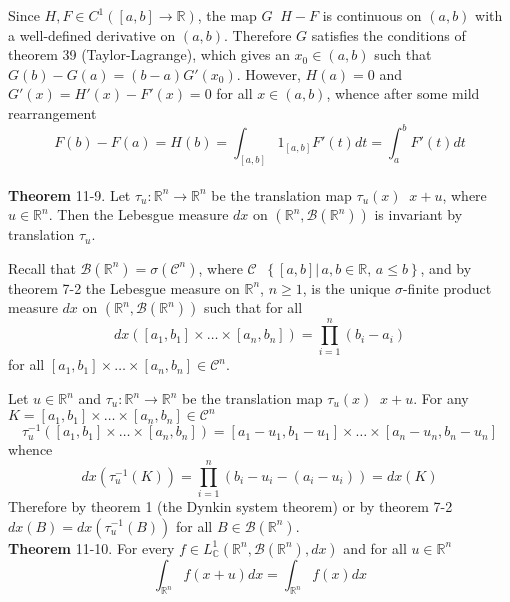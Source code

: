 \documentclass[a4paper]{article}
\newcommand{\obj}[1]{\left\{ #1 \right \}}
\newcommand{\clo}[1]{\left [ #1 \right ]}
\newcommand{\brac}[1]{\left ( #1 \right )}
\newcommand{\induc}[1]{\left . #1 \right \vert}
\newcommand{\Real}{\mathbb{R}}
\newcommand{\Cplx}{\mathbb{C}}
\newcommand{\Ccal}{\mathcal{C}}
\newcommand{\borel}[1]{\mathcal{B}\brac{#1}}
\newcommand{\defn}{\mathop{\overset{\Delta}{=}}\nolimits}
\begin{document}
Since $H,F\in C^1\brac{\clo{a,b}\to\Real}$, the map $G\defn H-F$ is continuous on $\brac{a,b}$ with a well-defined derivative on $\brac{a,b}$. Therefore $G$ satisfies the conditions of theorem 39 (Taylor-Lagrange), which gives an $x_0\in \brac{a,b}$ such that $G\brac{b}-G\brac{a} = \brac{b-a} G'\brac{x_0}$. However, $H\brac{a}=0$ and $G'\brac{x} = H'\brac{x} - F'\brac{x} = 0$ for all $x\in \brac{a,b}$, whence after some mild rearrangement \[F\brac{b}-F\brac{a} = H\brac{b} = \int_{\clo{a,b}} 1_{\clo{a,b}} F'\brac{t} dt = \int_a^b F'\brac{t} dt\]\\

\label{thm:dx_n_translation_invariance} \noindent \textbf{Theorem} 11-9.
Let $\tau_u:\Real^n\to \Real^n$ be the translation map $\tau_u\brac{x}\defn x+u$, where $u\in \Real^n$. Then the Lebesgue measure $dx$ on $\brac{\Real^n, \borel{\Real^n}}$ is invariant by translation $\tau_u$.

Recall that $\borel{\Real^n} = \sigma\brac{ \Ccal^n }$, where $\Ccal\defn\obj{ \induc{\clo{a,b}}\, a,b\in \Real,\, a\leq b }$, and by theorem 7-2 the Lebesgue measure on $\Real^n$, $n\geq 1$, is the unique $\sigma$-finite product measure $dx$ on $\brac{\Real^n, \borel{\Real^n}}$ such that for all \[dx\brac{\clo{a_1, b_1}\times \ldots \times \clo{a_n, b_n}} = \prod_{i=1}^n \brac{b_i-a_i}\] for all $\clo{a_1, b_1}\times \ldots \times \clo{a_n, b_n}\in \Ccal^n$.

Let $u\in \Real^n$ and $\tau_u:\Real^n\to \Real^n$ be the translation map $\tau_u\brac{x}\defn x+u$. For any $K=\clo{a_1, b_1}\times \ldots \times \clo{a_n, b_n}\in \Ccal^n$ \[\tau_u^{-1}\brac{\clo{a_1, b_1}\times \ldots \times \clo{a_n, b_n}} = \clo{a_1-u_1, b_1-u_1}\times \ldots \times \clo{a_n-u_n, b_n-u_n}\] whence \[dx\brac{\tau_u^{-1}\brac{K}} = \prod_{i=1}^n \brac{b_i-u_i-\brac{a_i-u_i}} = dx\brac{K} \] Therefore by theorem 1 (the Dynkin system theorem) or by theorem 7-2 $dx\brac{B} = dx\brac{\tau_u^{-1}\brac{B}}$ for all $B\in \borel{\Real^n}$.\\


\label{thm:dx_n_integral_translation} \noindent \textbf{Theorem} 11-10.
For every $f\in L^1_\Cplx\brac{\Real^n, \borel{\Real^n}, dx}$ and for all $u\in \Real^n$ \[\int_{\Real^n} f\brac{x+u} dx = \int_{\Real^n} f\brac{x} dx\]
\end{document}
